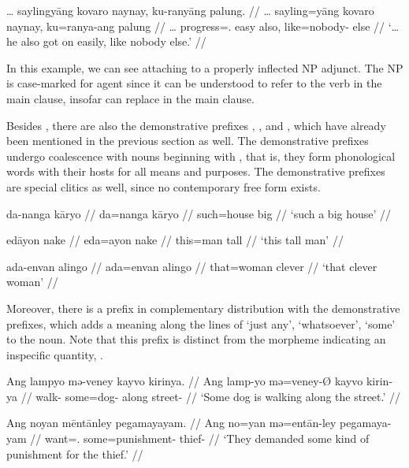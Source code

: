 \ex\label{ex:kukafka2}\begingl
	\gla … saylingyāng kovaro naynay, ku-ranyāng palung. //
	\glb … sayling=yāng kovaro naynay, ku=ranya-ang palung //
	\glc … progress=\TsgM{}.\Aarg{} easy also, like=nobody-\Aarg{} else //
	\glft `… he also got on easily, like nobody else.'%
	//
\endgl\xe

In this example, we can see  attaching to a properly inflected 
NP adjunct. The NP is case-marked for agent since it can be understood to refer 
to the verb  in the main clause, insofar 
 can replace 
 in the main clause.

Besides , there are also the demonstrative prefixes 
, , and , which 
have already been mentioned in the previous section as well. The demonstrative 
prefixes undergo coalescence with nouns beginning with , that is, they 
form phonological words with their hosts for all means and purposes. The 
demonstrative prefixes are special clitics as well, since no contemporary free 
form exists.

\pex
\a\begingl
	\gla da-nanga kāryo //
	\glb da=nanga kāryo //
	\glc such=house big //
	\glft `such a big house' //
\endgl

\a\begingl
	\gla edāyon nake //
	\glb eda=ayon nake //
	\glc this=man tall //
	\glft `this tall man' //
\endgl

\a\begingl
	\gla ada-envan alingo //
	\glb ada=envan alingo //
	\glc that=woman clever //
	\glft `that clever woman' //
\endgl

\xe

Moreover, there is a prefix  in complementary distribution with 
the demonstrative prefixes, which adds a meaning along the lines of `just any', 
`whatsoever', `some' to the noun. Note that this prefix is distinct from the 
morpheme indicating an inspecific quantity, .

\pex
\a\begingl
	\gla Ang lampyo mə-veney kayvo kirinya. //
	\glb Ang lamp-yo mə=veney-Ø kayvo kirin-ya //
	\glc \AgtT{} walk-\TsgN{} some=dog-\Top{} along street-\Loc{} //
	\glft `Some dog is walking along the street.' //
\endgl

\a\begingl
	\gla Ang noyan mēntānley pegamayayam. //
	\glb Ang no=yan mə=entān-ley pegamaya-yam //
	\glc \AgtT{} want=\TsgM{}.\Top{} some=punishment-\PargI{} 
		thief-\Dat{} //
	\glft `They demanded some kind of punishment for the thief.' //
\endgl


